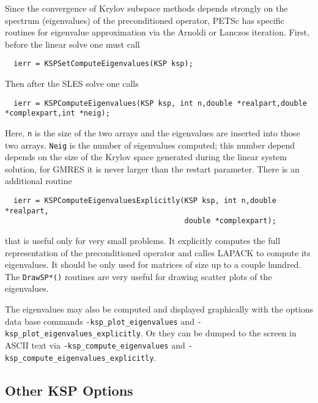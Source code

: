 Since the convergence of Krylov subspace methods depends strongly on 
the spectrum (eigenvalues) of the preconditioned operator, PETSc has specific
routines for eigenvalue approximation via the Arnoldi or Lanczos iteration.
First, before the linear solve one must call 
\begin{verbatim}
  ierr = KSPSetComputeEigenvalues(KSP ksp);
\end{verbatim}
Then after the SLES solve one calls 
\begin{verbatim}
  ierr = KSPComputeEigenvalues(KSP ksp, int n,double *realpart,double *complexpart,int *neig);
\end{verbatim}
Here, {\tt n} is the size of the two arrays and the eigenvalues are 
inserted into those two arrays. {\tt Neig} is the number of eigenvalues computed;
this number depend depends on the size of the Krylov space generated during the 
linear system solution, for GMRES it is never larger than the restart parameter.
There is an additional routine 
\begin{verbatim}
  ierr = KSPComputeEigenvaluesExplicitly(KSP ksp, int n,double *realpart,
                                         double *complexpart);
\end{verbatim}
that is useful only for very small problems. It explicitly computes the 
full representation of the preconditioned operator and calles LAPACK to 
compute its eigenvalues. It should be only used for matrices of size up to 
a couple hundred.  The {\tt DrawSP*()} routines are very useful for 
drawing scatter plots of the eigenvalues. 

The eigenvalues may also be computed and displayed graphically with the options 
data base commands {\tt -ksp\_plot\_eigenvalues} and {\tt -ksp\_plot\_eigenvalues\_explicitly}.
 
Or they can be dumped to the screen in ASCII text via
{\tt -ksp\_compute\_eigenvalues} and {\tt -ksp\_compute\_eigenvalues\_explicitly}.
 
   

\subsection{Other KSP Options}

